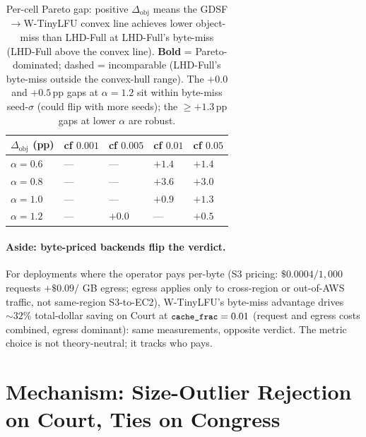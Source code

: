 \documentclass[letterpaper,twocolumn,10pt]{article}
\newcommand{\code}[1]{\texttt{\small #1}}
\begin{document}
\begin{table}[t]
\centering
\footnotesize
\renewcommand{\arraystretch}{0.95}
\begin{tabularx}{\columnwidth}{@{}lXXXX@{}}
\toprule
$\Delta_{\text{obj}}$ (pp)
& cf $0.001$ & cf $0.005$ & cf $0.01$ & cf $0.05$ \\
\midrule
$\alpha = 0.6$ & --- & --- & $\mathbf{+1.4}$ & $\mathbf{+1.4}$ \\
$\alpha = 0.8$ & --- & --- & $\mathbf{+3.6}$ & $\mathbf{+3.0}$ \\
$\alpha = 1.0$ & --- & --- & $\mathbf{+0.9}$ & $\mathbf{+1.3}$ \\
$\alpha = 1.2$ & --- & $\mathbf{+0.0}$ & --- & $\mathbf{+0.5}$ \\
\bottomrule
\end{tabularx}
\caption{Per-cell Pareto gap: positive $\Delta_{\text{obj}}$ means the
GDSF$\to$W-TinyLFU convex line achieves lower object-miss than LHD-Full
at LHD-Full's byte-miss (LHD-Full above the convex line). \textbf{Bold} = Pareto-dominated; dashed =
incomparable (LHD-Full's byte-miss outside the convex-hull range).
The $+0.0$ and $+0.5$\,pp gaps at $\alpha = 1.2$ sit within byte-miss
seed-$\sigma$ (could flip with more seeds); the $\geq +1.3$\,pp gaps
at lower $\alpha$ are robust.}
\label{tab:lhdfull-pareto}
\end{table}

\paragraph{Aside: byte-priced backends flip the verdict.} For
deployments where the operator pays per-byte (S3 pricing: $\$0.0004
/ 1{,}000$ requests $+ \$0.09 /$ GB egress; egress applies only to
cross-region or out-of-AWS traffic, not same-region S3-to-EC2),
W-TinyLFU's byte-miss advantage drives $\sim 32\%$ total-dollar
saving on Court at $\code{cache\_frac}=0.01$ (request and egress
costs combined, egress dominant): same measurements, opposite
verdict. The metric choice is not theory-neutral; it tracks who pays.

\section{Mechanism: Size-Outlier Rejection on Court, Ties on Congress}\label{sec:mechanism}
\end{document}
